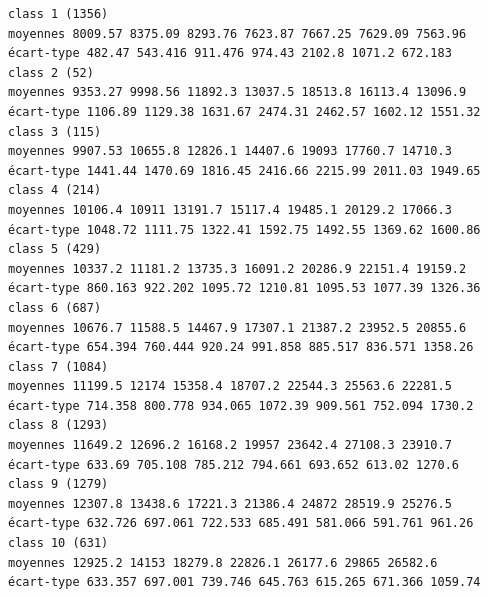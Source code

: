 \documentclass[environments,article,submit,pdftex,moreauthors]{Definitions/mdpi}
\begin{document}
\begin{scriptsize}
\begin{verbatim}
class 1 (1356)
moyennes 8009.57 8375.09 8293.76 7623.87 7667.25 7629.09 7563.96
écart-type 482.47 543.416 911.476 974.43 2102.8 1071.2 672.183
class 2 (52)
moyennes 9353.27 9998.56 11892.3 13037.5 18513.8 16113.4 13096.9
écart-type 1106.89 1129.38 1631.67 2474.31 2462.57 1602.12 1551.32
class 3 (115)
moyennes 9907.53 10655.8 12826.1 14407.6 19093 17760.7 14710.3
écart-type 1441.44 1470.69 1816.45 2416.66 2215.99 2011.03 1949.65
class 4 (214)
moyennes 10106.4 10911 13191.7 15117.4 19485.1 20129.2 17066.3
écart-type 1048.72 1111.75 1322.41 1592.75 1492.55 1369.62 1600.86
class 5 (429)
moyennes 10337.2 11181.2 13735.3 16091.2 20286.9 22151.4 19159.2
écart-type 860.163 922.202 1095.72 1210.81 1095.53 1077.39 1326.36
class 6 (687)
moyennes 10676.7 11588.5 14467.9 17307.1 21387.2 23952.5 20855.6
écart-type 654.394 760.444 920.24 991.858 885.517 836.571 1358.26
class 7 (1084)
moyennes 11199.5 12174 15358.4 18707.2 22544.3 25563.6 22281.5
écart-type 714.358 800.778 934.065 1072.39 909.561 752.094 1730.2
class 8 (1293)
moyennes 11649.2 12696.2 16168.2 19957 23642.4 27108.3 23910.7
écart-type 633.69 705.108 785.212 794.661 693.652 613.02 1270.6
class 9 (1279)
moyennes 12307.8 13438.6 17221.3 21386.4 24872 28519.9 25276.5
écart-type 632.726 697.061 722.533 685.491 581.066 591.761 961.26
class 10 (631)
moyennes 12925.2 14153 18279.8 22826.1 26177.6 29865 26582.6
écart-type 633.357 697.001 739.746 645.763 615.265 671.366 1059.74


\end{verbatim}
\end{scriptsize}
\end{document}
